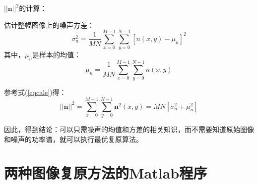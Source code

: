 \documentclass[UTF8]{ctexart}
\begin{document}
    $||\pmb{n}||^2$的计算：

    估计整幅图像上的噪声方差：
    \begin{equation}
        \sigma_n^2=\frac{1}{MN}\sum\limits_{x=0}^{M-1}\sum\limits_{y=0}^{N-1} \left[n(x,y)-\mu_n\right]^2
    \end{equation}
    其中，$\mu_n$是样本的均值：
    \begin{equation}
        \mu_n=\frac{1}{MN}\sum\limits_{x=0}^{M-1}\sum\limits_{y=0}^{N-1} n(x,y)
    \end{equation}

    参考式(\ref{eqcale})得：
    \begin{equation}
        ||\pmb{n}||^2=\sum\limits_{x=0}^{M-1}\sum\limits_{y=0}^{N-1} \pmb{n}^2(x,y)=MN\left[\sigma_n^2+\mu_n^2\right]
    \end{equation}

    因此，得到结论：可以只需噪声的均值和方差的相关知识，而不需要知道原始图像和噪声的功率谱，就可以执行最优复原算法。
    \clearpage
    \section{两种图像复原方法的Matlab程序}
\end{document}
